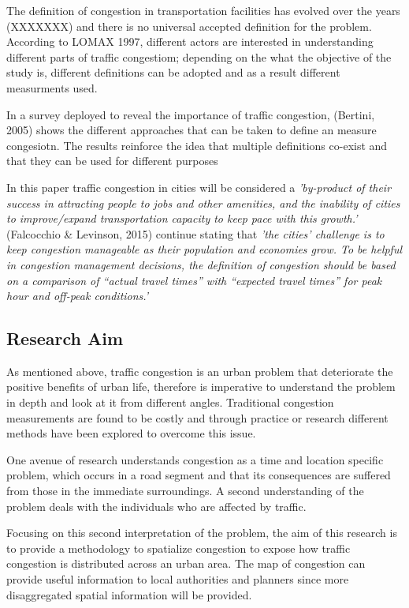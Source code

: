 \documentclass[a4paper]{jpconf}
\begin{document}
\indent The definition of congestion in transportation facilities has evolved over the years (XXXXXXX) and there is no universal accepted definition for the problem. According to LOMAX 1997, different actors are interested in understanding different parts of traffic congestiom; depending on the what the objective of the study is, different definitions can be adopted and as a result different measurments used. 

\indent In a survey deployed to reveal the importance of traffic congestion, (Bertini, 2005) shows the different approaches that can be taken to define an measure congesiotn. The results reinforce the idea that multiple definitions co-exist and that they can be used for different purposes

\indent In this paper traffic congestion in cities will be considered a \textit{'by-product of their success in attracting people to jobs and other amenities, and the inability of cities to improve/expand transportation capacity to keep pace with this growth.'} (Falcocchio \& Levinson, 2015) continue stating that \textit{'the cities’ challenge is to keep congestion manageable as their population and economies grow. To be helpful in congestion management decisions, the definition of congestion should be based on a comparison of “actual travel times” with “expected travel times” for peak hour and off-peak conditions.'}


\subsection{Research Aim}%
\indent As mentioned above, traffic congestion is an urban problem that deteriorate the positive benefits of urban life, therefore is imperative to understand the problem in depth and look at it from different angles. Traditional congestion measurements are found to be costly and through practice or research different methods have been explored to overcome this issue. \par
\indent One avenue of research understands congestion as a time and location specific problem, which occurs in a road segment and that its consequences are suffered from those in the immediate surroundings. A second understanding of the problem deals with the individuals who are affected by traffic. \par
\indent Focusing on this second interpretation of the problem, the aim of this research is to provide a methodology to spatialize congestion to expose how traffic congestion is distributed across an urban area. The map of congestion can provide useful information to local authorities and planners since more disaggregated spatial information will be provided. \par
\end{document}
